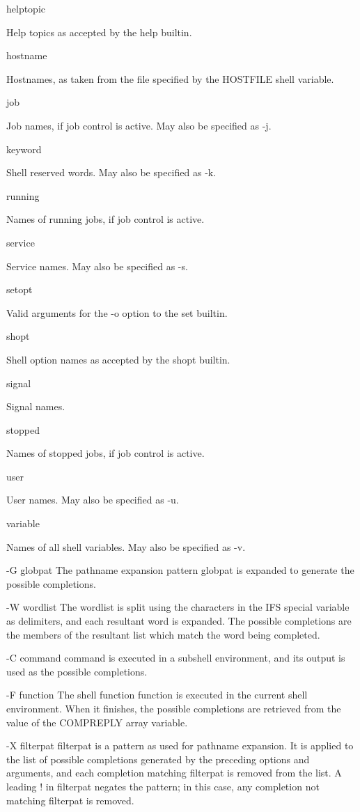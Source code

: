 helptopic

Help topics as accepted by the help builtin.

hostname

Hostnames, as taken from the file specified by the HOSTFILE shell variable.

job

Job names, if job control is active. May also be specified as -j.

keyword

Shell reserved words. May also be specified as -k.

running

Names of running jobs, if job control is active.

service

Service names. May also be specified as -s.

setopt

Valid arguments for the -o option to the set builtin.

shopt

Shell option names as accepted by the shopt builtin.

signal

Signal names.

stopped

Names of stopped jobs, if job control is active.

user

User names. May also be specified as -u.

variable

Names of all shell variables. May also be specified as -v.

-G globpat
The pathname expansion pattern globpat is expanded to generate the possible completions.

-W wordlist
The wordlist is split using the characters in the IFS special variable as delimiters, and each resultant word is expanded. The possible completions are the members of the resultant list which match the word being completed.

-C command
command is executed in a subshell environment, and its output is used as the possible completions.

-F function
The shell function function is executed in the current shell environment. When it finishes, the possible completions are retrieved from the value of the COMPREPLY array variable.

-X filterpat
filterpat is a pattern as used for pathname expansion. It is applied to the list of possible completions generated by the preceding options and arguments, and each completion matching filterpat is removed from the list. A leading ! in filterpat negates the pattern; in this case, any completion not matching filterpat is removed.

